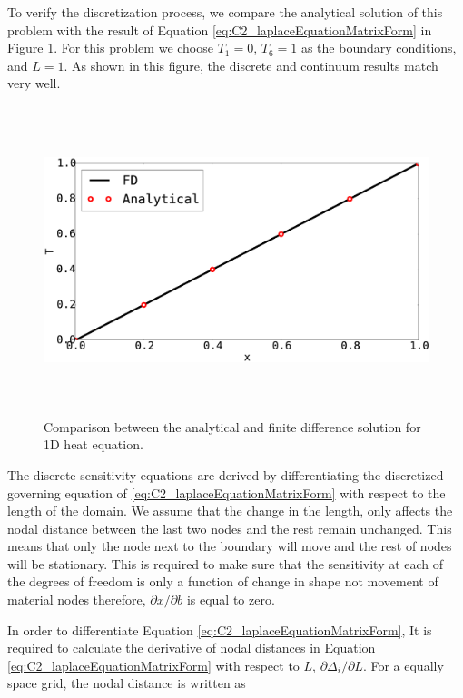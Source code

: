 To verify the discretization process, we compare the analytical solution of this problem with the result of Equation \eqref{eq:C2_laplaceEquationMatrixForm} in Figure \ref{fig:C2_verificationOfSolver}. For this problem we choose $T_1 = 0$, $T_6 = 1$ as the boundary conditions, and $L = 1$.  As shown in this figure, the discrete and continuum results match very well.

\begin{figure}[h]
	\centering
	\includegraphics[height=9.00cm]{Chapter_2/figure/finitedifference_vs_analytical.eps}
	\caption{Comparison between the analytical and finite difference solution for 1D heat equation.}
	\label{fig:C2_verificationOfSolver}
\end{figure}

The discrete sensitivity equations are derived by differentiating the discretized governing equation of \eqref{eq:C2_laplaceEquationMatrixForm} with respect to the length of the domain. We assume that the change in the length, only affects the nodal distance between the last two nodes and the rest remain unchanged. This means that only the node next to the boundary will move and the rest of nodes will be stationary. This is required to make sure that the sensitivity at each of the degrees of freedom is only a function of change in shape not movement of material nodes therefore, $\partial x/\partial b$ is equal to zero.

In order to differentiate Equation  \eqref{eq:C2_laplaceEquationMatrixForm}, It is required to calculate the derivative of nodal distances in Equation \eqref{eq:C2_laplaceEquationMatrixForm} with respect to $L$, $\partial \Delta_i/\partial L$. For a equally space grid, the nodal distance is written as

